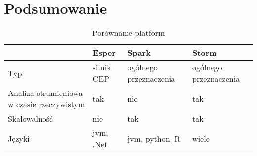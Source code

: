 \section{Podsumowanie}
\begin{table}[h]
  \caption{Porównanie platform}
  \label{stream-summary-table}
  \begin{tabular}{l l l l}
     & Esper & Spark & Storm \\
    \hline
    Typ & silnik CEP & ogólnego przeznaczenia & ogólnego przeznaczenia \\
    Analiza strumieniowa w czasie rzeczywistym & tak & nie & tak \\
    Skalowalność & nie & tak & tak \\
    Języki & jvm, .Net & jvm, python, R & wiele \\
  \end{tabular}
\end{table}
